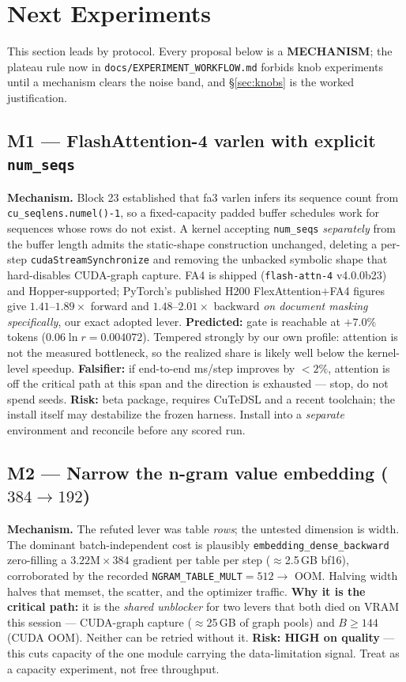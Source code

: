\documentclass{article}
\begin{document}
\section{Next Experiments}
This section leads by protocol. Every proposal below is a \textbf{MECHANISM}; the plateau rule now in \texttt{docs/EXPERIMENT\_WORKFLOW.md} forbids knob experiments until a mechanism clears the noise band, and \S\ref{sec:knobs} is the worked justification.

\subsection{M1 --- FlashAttention-4 varlen with explicit \texttt{num\_seqs}}
\textbf{Mechanism.} Block 23 established that fa3 varlen infers its sequence count from \texttt{cu\_seqlens.numel()-1}, so a fixed-capacity padded buffer schedules work for sequences whose rows do not exist. A kernel accepting \texttt{num\_seqs} \emph{separately} from the buffer length admits the static-shape construction unchanged, deleting a per-step \texttt{cudaStreamSynchronize} and removing the unbacked symbolic shape that hard-disables CUDA-graph capture. FA4 is shipped (\texttt{flash-attn-4} v4.0.0b23) and Hopper-supported; PyTorch's published H200 FlexAttention$+$FA4 figures give $1.41$--$1.89\times$ forward and $1.48$--$2.01\times$ backward \emph{on document masking specifically}, our exact adopted lever.
\textbf{Predicted:} gate is reachable at $+7.0\%$ tokens ($0.06\ln r = 0.004072$). Tempered strongly by our own profile: attention is not the measured bottleneck, so the realized share is likely well below the kernel-level speedup.
\textbf{Falsifier:} if end-to-end ms/step improves by ${<}2\%$, attention is off the critical path at this span and the direction is exhausted --- stop, do not spend seeds.
\textbf{Risk:} beta package, requires CuTeDSL and a recent toolchain; the install itself may destabilize the frozen harness. Install into a \emph{separate} environment and reconcile before any scored run.

\subsection{M2 --- Narrow the n-gram value embedding ($384 \to 192$)}
\textbf{Mechanism.} The refuted lever was table \emph{rows}; the untested dimension is width. The dominant batch-independent cost is plausibly \texttt{embedding\_dense\_backward} zero-filling a $3.22\mathrm{M}\times384$ gradient per table per step ($\approx$2.5\,GB bf16), corroborated by the recorded \texttt{NGRAM\_TABLE\_MULT}$=512 \to$ OOM. Halving width halves that memset, the scatter, and the optimizer traffic.
\textbf{Why it is the critical path:} it is the \emph{shared unblocker} for two levers that both died on VRAM this session --- CUDA-graph capture ($\approx$25\,GB of graph pools) and $B{\ge}144$ (CUDA OOM). Neither can be retried without it.
\textbf{Risk: HIGH on quality} --- this cuts capacity of the one module carrying the data-limitation signal. Treat as a capacity experiment, not free throughput.
\end{document}
